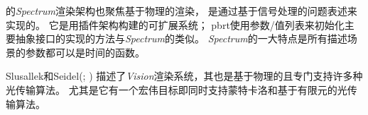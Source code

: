 \citet{glassner1993spectrum}的\emph{Spectrum}渲染架构也聚焦基于物理的渲染，
是通过基于信号处理的问题表述来实现的。
它是用插件架构构建的可扩展系统；
pbrt使用参数/值列表来初始化主要抽象接口的实现的方法与\emph{Spectrum}的类似。
\emph{Spectrum}的一大特点是所有描述场景的参数都可以是时间的函数。

Slusallek和Seidel(\cite*{468387,10.1007/978-3-7091-7484-5_6}; \citealt{slusallek1996vision})
描述了\emph{Vision}渲染系统，其也是基于物理的且专门支持许多种光传输算法。
尤其是它有一个宏伟目标即同时支持蒙特卡洛和基于有限元的光传输算法。